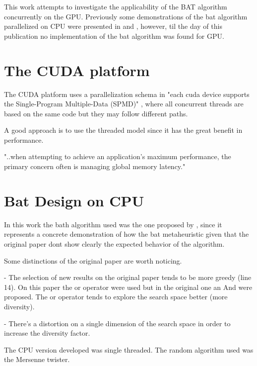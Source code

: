 \documentclass[conference]{IEEEtran}
\begin{document}
This work attempts to investigate the applicability of the BAT algorithm
concurrently on the GPU. Previously some demonstrations of the bat
algorithm parallelized on CPU were presented in \cite{paralellCPUFirst}
and \cite{paralellCPU}, however, til the day of this publication no
implementation of the bat algorithm was found for GPU. 

\section{The CUDA platform}

The CUDA platform uses a parallelization schema in "each cuda device supports the Single-Program Multiple-Data (SPMD)" \cite{cuda_optimizations}, where all concurrent threads are based on the same code but they may follow different paths.


A good approach is to use the threaded model since it has the great benefit in performance.


"..when attempting to achieve an application's maximum
performance, the primary concern often is managing global memory
latency." \cite{cuda_optimizations}

\section{Bat Design on CPU}

In this work the bath algorithm used was the one proposed by
\autocite{Jelson et al.}, since it represents a concrete demonstration of how
the bat metaheuristic given that the original paper dont show clearly the expected behavior of the algorithm.

Some distinctions of the original paper are worth noticing.

- The selection of new results on the original paper tends to be more greedy (line 14).
On this paper the or operator were used but in the original one an And were proposed.
The or operator tends to explore the search space better (more diversity).

- There's a distortion on a single dimension of the search space in order to increase the diversity factor.

The CPU version developed was single threaded.
The random algorithm used was the Mersenne twister.
\end{document}
